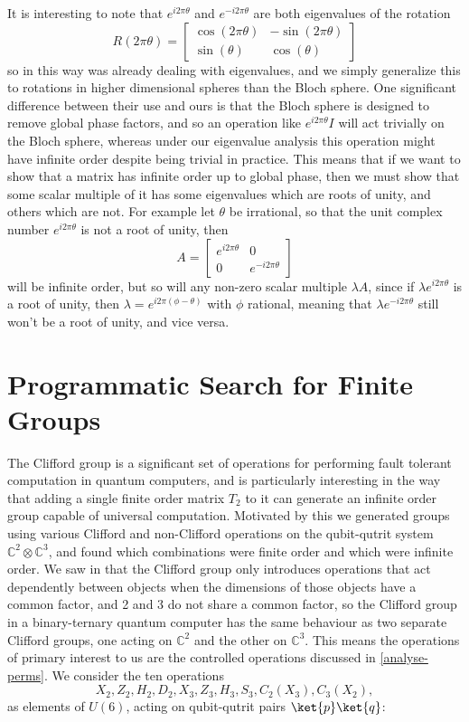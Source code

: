 It is interesting to note that $e^{i 2\pi\theta}$ and $e^{-i 2\pi\theta}$ are both eigenvalues of the rotation
\[R(2\pi \theta) = \left[\begin{matrix}
	\cos(2\pi\theta) & -\sin(2\pi\theta) \\
	\sin(\theta) & \cos(\theta)
\end{matrix}\right]\]
so in this way \cite{universal-qubit} was already dealing with eigenvalues, and we simply generalize this to rotations in higher dimensional spheres than the Bloch sphere. One significant difference between their use and ours is that the Bloch sphere is designed to remove global phase factors, and so an operation like $e^{i2\pi\theta}I$ will act trivially on the Bloch sphere, whereas under our eigenvalue analysis this operation might have infinite order despite being trivial in practice. This means that if we want to show that a matrix has infinite order up to global phase, then we must show that some scalar multiple of it has some eigenvalues which are roots of unity, and others which are not. For example let $\theta$ be irrational, so that the unit complex number $e^{i2\pi\theta}$ is not a root of unity, then
\[A = \left[\begin{matrix}
	e^{i2\pi\theta} & 0 \\
	0 & e^{-i2\pi\theta}
\end{matrix}\right]\]
will be infinite order, but so will any non-zero scalar multiple $\lambda A$, since if $\lambda e^{i2\pi\theta}$ is a root of unity, then $\lambda = e^{i2\pi(\phi - \theta)}$ with $\phi$ rational, meaning that $\lambda e^{-i2\pi\theta}$ still won't be a root of unity, and vice versa.

\section{Programmatic Search for Finite Groups}\label{prog-search}
The Clifford group is a significant set of operations for performing fault tolerant computation in quantum computers, and is particularly interesting in the way that adding a single finite order matrix $T_2$ to it can generate an infinite order group capable of universal computation. Motivated by this we generated groups using various Clifford and non-Clifford operations on the qubit-qutrit system $\mathbb{C}^2 \otimes \mathbb{C}^3$, and found which combinations were finite order and which were infinite order. We saw in \cite{tolar-clifford} that the Clifford group only introduces operations that act dependently between objects when the dimensions of those objects have a common factor, and 2 and 3 do not share a common factor, so the Clifford group in a binary-ternary quantum computer has the same behaviour as two separate Clifford groups, one acting on $\mathbb{C}^2$ and the other on $\mathbb{C}^3$. This means the operations of primary interest to us are the controlled operations discussed in \autoref{analyse-perms}. We consider the ten operations
\[X_2, Z_2, H_2, D_2, X_3, Z_3, H_3, S_3, C_2(X_3), C_3(X_2),\]
as elements of $U(6)$, acting on qubit-qutrit pairs $\ket{p}\ket{q}$:

